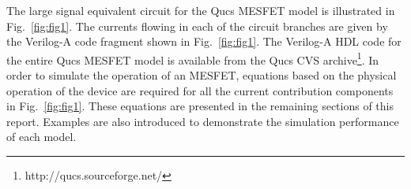 
The large signal equivalent circuit for the Qucs MESFET model is
illustrated in Fig.~\ref{fig:fig1}. The currents flowing in each of
the circuit branches are given by the Verilog-A code fragment shown in
Fig.~\ref{fig:fig1}. The Verilog-A HDL code for the entire Qucs MESFET
model is available from the Qucs CVS
archive\footnote{http://qucs.sourceforge.net/}.  In order to simulate
the operation of an MESFET, equations based on the physical operation
of the device are required for all the current contribution components
in Fig.~\ref{fig:fig1}. These equations are presented in the remaining
sections of this report.  Examples are also introduced to demonstrate
the simulation performance of each model.



